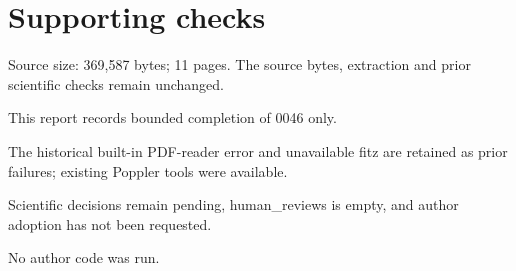 \documentclass[10pt]{article}
\begin{document}
\section*{Supporting checks}
Source size: 369,587 bytes; 11 pages. The source bytes, extraction and prior scientific checks remain unchanged.\par
This report records bounded completion of 0046 only.\par
The historical built-in PDF-reader error and unavailable fitz are retained as prior failures; existing Poppler tools were available.\par
Scientific decisions remain pending, human\_reviews is empty, and author adoption has not been requested.\par
No author code was run.\par
\end{document}

